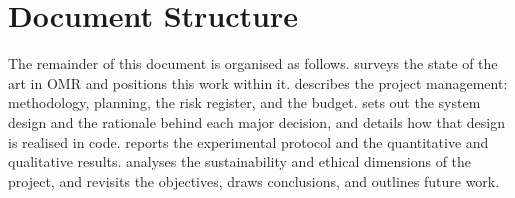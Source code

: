 \section{Document Structure}
\label{sec:intro-structure}

The remainder of this document is organised as follows.
 surveys the state of the art in OMR and positions this work
within it.  describes the project management: methodology,
planning, the risk register, and the budget.  sets out the
system design and the rationale behind each major decision, and
 details how that design is realised in code.
 reports the experimental protocol and the quantitative and
qualitative results.  analyses the sustainability and
ethical dimensions of the project, and  revisits the
objectives, draws conclusions, and outlines future work.

